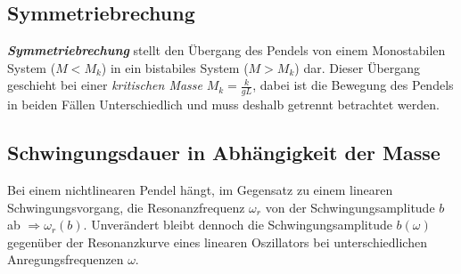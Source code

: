 \subsection{Symmetriebrechung}
\label{sub:symbrechung}
\textit{\textbf{Symmetriebrechung}} stellt den Übergang des Pendels von einem Monostabilen System ($M<M_k$) in ein bistabiles System ($M>M_k$) dar. Dieser Übergang geschieht bei einer \textit{kritischen Masse} $M_k=\frac{k}{gL}$, dabei ist die Bewegung des Pendels in beiden Fällen Unterschiedlich und muss deshalb getrennt betrachtet werden. \citep{Lueck}

\subsection{Schwingungsdauer in Abhängigkeit der Masse}
\label{sub:schwingungsdauer}
Bei einem nichtlinearen Pendel hängt, im Gegensatz zu einem linearen Schwingungsvorgang, die Resonanzfrequenz $\omega_r$ von der Schwingungsamplitude $b$ ab $\Rightarrow \omega_r(b)$. Unverändert bleibt dennoch die Schwingungsamplitude $b(\omega)$ gegenüber der Resonanzkurve eines linearen Oszillators bei unterschiedlichen Anregungsfrequenzen $\omega$. \citep{Lueck}
